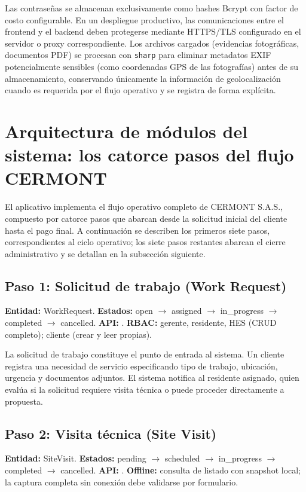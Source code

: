 Las contraseñas se almacenan exclusivamente como hashes Bcrypt con factor de costo configurable. En un despliegue productivo, las comunicaciones entre el frontend y el backend deben protegerse mediante HTTPS/TLS configurado en el servidor o proxy correspondiente. Los archivos cargados (evidencias fotográficas, documentos PDF) se procesan con \texttt{sharp} para eliminar metadatos EXIF potencialmente sensibles (como coordenadas GPS de las fotografías) antes de su almacenamiento, conservando únicamente la información de geolocalización cuando es requerida por el flujo operativo y se registra de forma explícita.

\section{Arquitectura de módulos del sistema: los catorce pasos del flujo CERMONT}
\label{sec:modulos-flujo}

El aplicativo implementa el flujo operativo completo de CERMONT S.A.S., compuesto por catorce pasos que abarcan desde la solicitud inicial del cliente hasta el pago final. A continuación se describen los primeros siete pasos, correspondientes al ciclo operativo; los siete pasos restantes abarcan el cierre administrativo y se detallan en la subsección siguiente.

\subsection{Paso 1: Solicitud de trabajo (Work Request)}

\textbf{Entidad:} WorkRequest. \textbf{Estados:} open $\rightarrow$ assigned $\rightarrow$ in\_progress $\rightarrow$ completed $\rightarrow$ cancelled. \textbf{API:} . \textbf{RBAC:} gerente, residente, HES (CRUD completo); cliente (crear y leer propias).

La solicitud de trabajo constituye el punto de entrada al sistema. Un cliente registra una necesidad de servicio especificando tipo de trabajo, ubicación, urgencia y documentos adjuntos. El sistema notifica al residente asignado, quien evalúa si la solicitud requiere visita técnica o puede proceder directamente a propuesta.

\subsection{Paso 2: Visita técnica (Site Visit)}

\textbf{Entidad:} SiteVisit. \textbf{Estados:} pending $\rightarrow$ scheduled $\rightarrow$ in\_progress $\rightarrow$ completed $\rightarrow$ cancelled. \textbf{API:} . \textbf{Offline:} consulta de listado con snapshot local; la captura completa sin conexión debe validarse por formulario.

